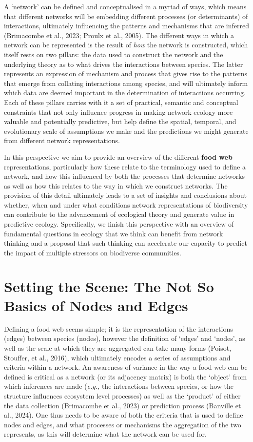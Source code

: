 \documentclass[
]{article}
\begin{document}
A `network' can be defined and conceptualised in a myriad of ways, which
means that different networks will be embedding different processes (or
determinants) of interactions, ultimately influencing the patterns and
mechanisms that are inferred (Brimacombe et al., 2023; Proulx et al.,
2005). The different ways in which a network can be represented is the
result of \emph{how} the network is constructed, which itself rests on
two pillars: the data used to construct the network and the underlying
theory as to what drives the interactions between species. The latter
represents an expression of mechanism and process that gives rise to the
patterns that emerge from collating interactions among species, and will
ultimately inform which data are deemed important in the determination
of interactions occurring. Each of these pillars carries with it a set
of practical, semantic and conceptual constraints that not only
influence progress in making network ecology more valuable and
potentially predictive, but help define the spatial, temporal, and
evolutionary scale of assumptions we make and the predictions we might
generate from different network representations.

In this perspective we aim to provide an overview of the different
\textbf{food web} representations, particularly how these relate to the
terminology used to define a network, and how this influenced by both
the processes that determine networks as well as how this relates to the
way in which we construct networks. The provision of this detail
ultimately leads to a set of insights and conclusions about whether,
when and under what conditions network representations of biodiversity
can contribute to the advancement of ecological theory and generate
value in predictive ecology. Specifically, we finish this perspective
with an overview of fundamental questions in ecology that we think can
benefit from network thinking and a proposal that such thinking can
accelerate our capacity to predict the impact of multiple stressors on
biodiverse communities.

\section{Setting the Scene: The Not So Basics of Nodes and
Edges}\label{sec-anatomy}

Defining a food web seems simple; it is the representation of the
interactions (edges) between species (nodes), however the definition of
`edges' and `nodes', as well as the scale at which they are aggregated
can take many forms (Poisot, Stouffer, et al., 2016), which ultimately
encodes a series of assumptions and criteria within a network. An
awareness of variance in the way a food web can be defined is critical
as a network (or its adjacency matrix) is both the `object' from which
inferences are made (\emph{e.g.,} the interactions between species, or
how the structure influences ecosystem level processes) as well as the
`product' of either the data collection (Brimacombe et al., 2023) or
prediction process (Banville et al., 2024). One thus needs to be aware
of both the criteria that is used to define nodes and edges, and what
processes or mechanisms the aggregation of the two represents, as this
will determine what the network can be used for.
\end{document}

